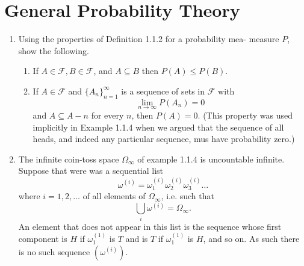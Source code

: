 \documentclass{article}
\newcommand{\F}{\mathcal{F}}
\begin{document}
\tableofcontents

\newpage

\section{General Probability Theory}
\begin{enumerate}
\item Using the properties of Definition 1.1.2 for a probability mea-
measure $P$, show the following.
\begin{enumerate}
	\item If $A \in \F, B \in \F$, and $A \subseteq B$ then $P(A) \leq P(B)$.
	\item If $A \in \F$ and $\{A_n\}_{n = 1}^\infty$ is a sequence of sets in $\F$ with
	$$
	\lim_{n \rightarrow \infty} P(A_n) = 0
	$$
	and $A \subseteq A-n$ for every $n$, then $P(A) = 0$. (This property was used implicitly in Example 1.1.4 when we argued that the sequence of all heads, and indeed any particular sequence, mus have probability zero.)
\end{enumerate}
	\item The infinite coin-toss space $\Omega_\infty$ of example 1.1.4 is uncountable infinite. Suppose that were was a sequential list
	$$
	\omega^{(i)} = \omega^{(i)}_1 \omega^{(i)}_2 \omega^{(i)}_3 \dots
	$$
	where $i = 1, 2, \dots$ of all elements of $\Omega_\infty$, i.e. such that
	$$
	\bigcup_i \omega^{(i)} = \Omega_\infty.
	$$
	An element that does not appear in this list is the sequence whose first component is $H$ if $\omega_1^{(1)}$ is $T$ and is $T$ if $\omega_1^{(1)}$ is $H$, and so on. As such there is no such sequence $(\omega^{(i)})$.


\end{enumerate}
\end{document}
